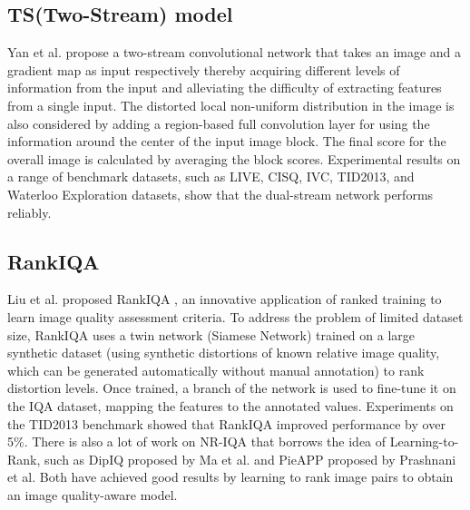 \documentclass{article}
\begin{document}

\subsection{TS(Two-Stream) model}
\label{TS(Two-Stream) model}

Yan et al. \cite{yan2018two}propose a two-stream convolutional network that takes an image and a gradient map as input respectively thereby acquiring different levels of information from the input and alleviating the difficulty of extracting features from a single input. The distorted local non-uniform distribution in the image is also considered by adding a region-based full convolution layer for using the information around the center of the input image block. The final score for the overall image is calculated by averaging the block scores. Experimental results on a range of benchmark datasets, such as LIVE, CISQ, IVC, TID2013, and Waterloo Exploration datasets, show that the dual-stream network performs reliably. 


\subsection{RankIQA}
\label{RankIQA}

Liu et al. \cite{liu2017rankiqa}proposed RankIQA , an innovative application of ranked training to learn image quality assessment criteria. To address the problem of limited dataset size, RankIQA uses a twin network (Siamese Network) trained on a large synthetic dataset (using synthetic distortions of known relative image quality, which can be generated automatically without manual annotation) to rank distortion levels. Once trained, a branch of the network is used to fine-tune it on the IQA dataset, mapping the features to the annotated values. Experiments on the TID2013 benchmark showed that RankIQA improved performance by over 5\%. There is also a lot of work on NR-IQA that borrows the idea of Learning-to-Rank, such as DipIQ \cite{ma2017dipiq} proposed by Ma et al. and PieAPP \cite{prashnani2018pieapp} proposed by Prashnani et al. Both have achieved good results by learning to rank image pairs to obtain an image quality-aware model.
\end{document}
